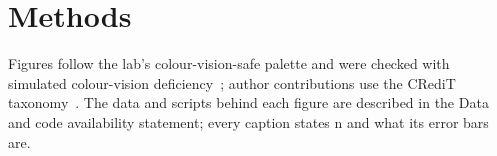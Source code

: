 \section{Methods}\label{sec:methods}
Figures follow the lab's colour-vision-safe palette and were checked with simulated
colour-vision deficiency~\cite{machado2009cvd}; author contributions use the CRediT
taxonomy~\cite{brand2015credit}.
The data and scripts behind each figure are described in the Data and code
availability statement; every caption states n and what its error bars are.
